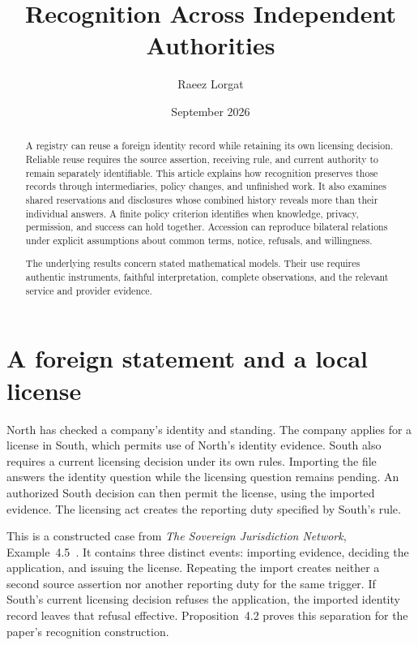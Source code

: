 \documentclass{momentum}
\title{Recognition Across Independent Authorities}
\author{Raeez Lorgat}
\date{September 2026}
\begin{document}
\maketitle

\begin{abstract}
A registry can reuse a foreign identity record while retaining its own licensing decision.
Reliable reuse requires the source assertion, receiving rule, and current authority to remain separately identifiable.
This article explains how recognition preserves those records through intermediaries, policy changes, and unfinished work.
It also examines shared reservations and disclosures whose combined history reveals more than their individual answers.
A finite policy criterion identifies when knowledge, privacy, permission, and success can hold together.
Accession can reproduce bilateral relations under explicit assumptions about common terms, notice, refusals, and willingness.

The underlying results concern stated mathematical models.
Their use requires authentic instruments, faithful interpretation, complete observations, and the relevant service and provider evidence.
\end{abstract}

\section{A foreign statement and a local license}
\label{sec:registry}

North has checked a company's identity and standing.
The company applies for a license in South, which permits use of North's identity evidence.
South also requires a current licensing decision under its own rules.
Importing the file answers the identity question while the licensing question remains pending.
An authorized South decision can then permit the license, using the imported evidence.
The licensing act creates the reporting duty specified by South's rule.

This is a constructed case from \emph{The Sovereign Jurisdiction Network}, Example~4.5~\cite{sjn}.
It contains three distinct events: importing evidence, deciding the application, and issuing the license.
Repeating the import creates neither a second source assertion nor another reporting duty for the same trigger.
If South's current licensing decision refuses the application, the imported identity record leaves that refusal effective.
Proposition~4.2 proves this separation for the paper's recognition construction.
\end{document}

